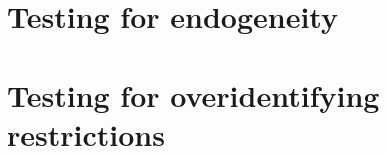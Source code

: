 

\section{Testing for endogeneity}
\label{app:endogeneity}


\section{Testing for overidentifying restrictions}
\label{app:overidentifying}
